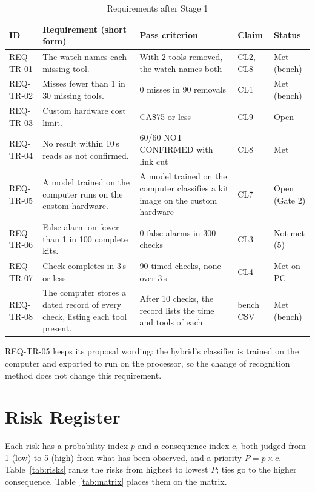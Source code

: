\begin{table}[!t]
\centering
\footnotesize
\caption{Requirements after Stage 1}
\label{tab:reqs}
\begin{tabularx}{\textwidth}{@{}l Y Y l l@{}}
\toprule
ID & Requirement (short form) & Pass criterion & Claim & Status \\
\midrule
REQ-TR-01 & The watch names each missing tool. & With 2 tools removed, the watch names both & CL2, CL8 & Met (bench) \\
REQ-TR-02 & Misses fewer than 1 in 30 missing tools. & 0 misses in 90 removals & CL1 & Met (bench) \\
REQ-TR-03 & Custom hardware cost limit. & CA\$75 or less & CL9 & Open \\
REQ-TR-04 & No result within 10\,s reads as not confirmed. & 60/60 NOT CONFIRMED with link cut & CL8 & Met \\
REQ-TR-05 & A model trained on the computer runs on the custom hardware. & A model trained on the computer classifies a kit image on the custom hardware & CL7 & Open (Gate 2) \\
REQ-TR-06 & False alarm on fewer than 1 in 100 complete kits. & 0 false alarms in 300 checks & CL3 & Not met (5) \\
REQ-TR-07 & Check completes in 3\,s or less. & 90 timed checks, none over 3\,s & CL4 & Met on PC \\
REQ-TR-08 & The computer stores a dated record of every check, listing each tool present. & After 10 checks, the record lists the time and tools of each & bench CSV & Met (bench) \\
\bottomrule
\end{tabularx}
\end{table}

REQ-TR-05 keeps its proposal wording: the hybrid's classifier is trained on
the computer and exported to run on the processor, so the change of
recognition method does not change this requirement.

\section{Risk Register}
\noindent Each risk has a probability index $p$ and a consequence index
$c$, both judged from 1 (low) to 5 (high) from what has been observed, and
a priority $P = p \times c$. Table~\ref{tab:risks} ranks the risks from
highest to lowest $P$; ties go to the higher consequence. Table~\ref{tab:matrix} places them on the matrix.

